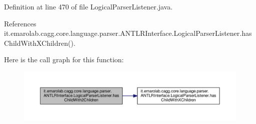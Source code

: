 Definition at line 470 of file Logical\-Parser\-Listener.\-java.



References it.\-emarolab.\-cagg.\-core.\-language.\-parser.\-A\-N\-T\-L\-R\-Interface.\-Logical\-Parser\-Listener.\-has\-Child\-With\-X\-Children().



Here is the call graph for this function\-:\nopagebreak
\begin{figure}[H]
\begin{center}
\leavevmode
\includegraphics[width=350pt]{classit_1_1emarolab_1_1cagg_1_1core_1_1language_1_1parser_1_1ANTLRInterface_1_1LogicalParserListener_a1edeb17a0fabac3fc9be5eacbcd27896_cgraph}
\end{center}
\end{figure}


